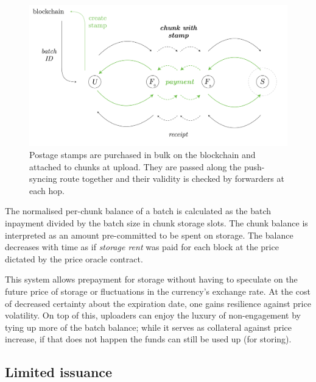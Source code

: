 \begin{figure}[!th]
\centering
  \includegraphics[width=\textwidth]{fig/postage-stamp.pdf}
\caption[Postage stamps]{Postage stamps are purchased in bulk on the blockchain and attached to chunks at upload. They are passed along the push-syncing route together and their validity is checked by forwarders at each hop. }
\label{fig:postage-stamps}
\end{figure}

The normalised per-chunk balance of a batch is calculated as the batch inpayment divided by the batch size in chunk storage slots. The chunk balance is interpreted as an amount pre-committed to be spent on storage. The balance decreases with time as if \emph{storage rent} was paid for each block at the price dictated by the price oracle contract.  

This system allows prepayment for storage without having to speculate on the future price of storage or fluctuations in the currency's exchange rate. At the cost of decreased certainty about the expiration date, one gains resilience against price volatility. On top of this, uploaders can enjoy the luxury of non-engagement by tying up more of the batch balance; while it serves as collateral against price increase, if that does not happen the funds can still be used up (for storing).


\subsection{Limited issuance}\label{sec:limited-issuance}


